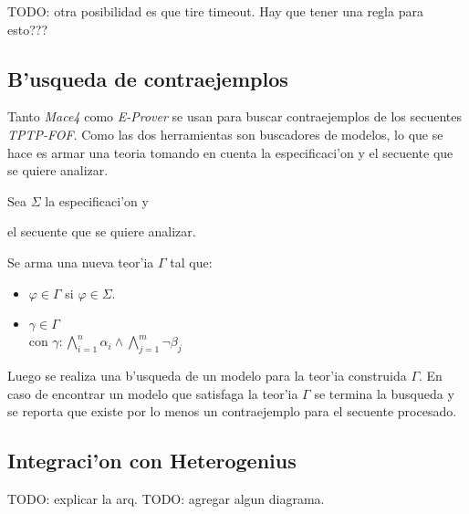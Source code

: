 TODO: otra posibilidad es que tire timeout. Hay que tener una regla para esto???

\subsection{B'usqueda de contraejemplos}

Tanto \textit{Mace4} como \textit{E-Prover} se usan para buscar contraejemplos de los secuentes \textit{TPTP-FOF}. Como las dos herramientas son buscadores de modelos, lo que se hace es armar una teoria tomando en cuenta la especificaci'on y el secuente que se quiere analizar.

Sea $\Sigma$ la especificaci'on y

\begin{prooftree}
\end{prooftree}

el secuente que se quiere analizar.

Se arma una nueva teor'ia $\Gamma$ tal que:

\begin{itemize}

\item $\varphi \in \Gamma$ si $\varphi \in \Sigma$.

\item $\gamma \in \Gamma$ \\
	con $\gamma: \bigwedge\limits_{i=1}^n{\alpha_i} \wedge \bigwedge\limits_{j=1}^m{\neg \beta_{j}}$

\end{itemize}

Luego se realiza una b'usqueda de un modelo para la teor'ia construida $\Gamma$. En caso de encontrar un modelo que satisfaga la teor'ia $\Gamma$ se termina la busqueda y se reporta que existe por lo menos un contraejemplo para el secuente procesado.


\subsection{Integraci'on con Heterogenius}

TODO: explicar la arq.
TODO: agregar algun diagrama.







